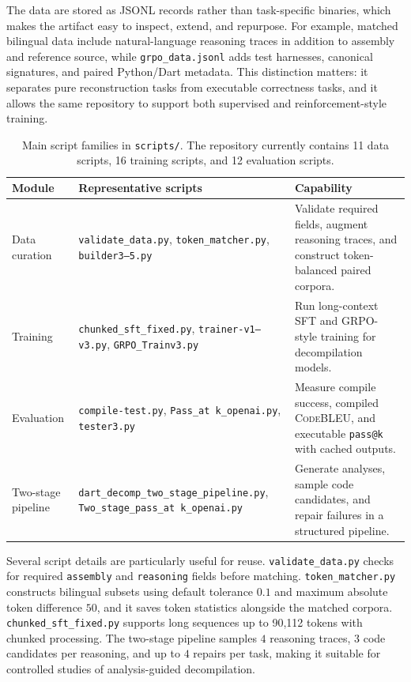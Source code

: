 \documentclass[sigconf,review]{acmart}
\begin{document}
The data are stored as JSONL records rather than task-specific binaries, which makes the artifact easy to inspect, extend, and repurpose. For example, matched bilingual data include natural-language reasoning traces in addition to assembly and reference source, while \texttt{grpo\_data.jsonl} adds test harnesses, canonical signatures, and paired Python/Dart metadata. This distinction matters: it separates pure reconstruction tasks from executable correctness tasks, and it allows the same repository to support both supervised and reinforcement-style training.

\begin{table}[t]
\caption{Main script families in \texttt{scripts/}. The repository currently contains 11 data scripts, 16 training scripts, and 12 evaluation scripts.}
\label{tab:tools}
\centering
\footnotesize
\begin{tabular}{p{}p{}p{}}
\toprule
\textbf{Module} & \textbf{Representative scripts} & \textbf{Capability} \\
\midrule
Data curation & \texttt{validate\_data.py}, \texttt{token\_matcher.py}, \texttt{builder3--5.py} & Validate required fields, augment reasoning traces, and construct token-balanced paired corpora. \\
Training & \texttt{chunked\_sft\_fixed.py}, \texttt{trainer-v1--v3.py}, \texttt{GRPO\_Trainv3.py} & Run long-context SFT and GRPO-style training for decompilation models. \\
Evaluation & \texttt{compile-test.py}, \texttt{Pass\_at k\_openai.py}, \texttt{tester3.py} & Measure compile success, compiled \textsc{CodeBLEU}, and executable \texttt{pass@k} with cached outputs. \\
Two-stage pipeline & \texttt{dart\_decomp\_two\_stage\_pipeline.py}, \texttt{Two\_stage\_pass\_at k\_openai.py} & Generate analyses, sample code candidates, and repair failures in a structured pipeline. \\
\bottomrule
\end{tabular}
\end{table}

Several script details are particularly useful for reuse. \texttt{validate\_data.py} checks for required \texttt{assembly} and \texttt{reasoning} fields before matching. \texttt{token\_matcher.py} constructs bilingual subsets using default tolerance \(0.1\) and maximum absolute token difference \(50\), and it saves token statistics alongside the matched corpora. \texttt{chunked\_sft\_fixed.py} supports long sequences up to 90,112 tokens with chunked processing. The two-stage pipeline samples \(4\) reasoning traces, \(3\) code candidates per reasoning, and up to \(4\) repairs per task, making it suitable for controlled studies of analysis-guided decompilation.
\end{document}
